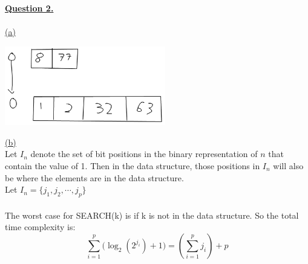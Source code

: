 \documentclass[12pt]{article}
\newcommand{\bigbracket}[1]{\big(#1\big)}
\newcommand{\code}[1]{{\ttfamily \fontseries{b}\selectfont #1}}
\begin{document}
\newpage
{{\LARGE \noindent \underline{\textbf{Question 2.}}}}
\\\\
\noindent \hyperlink{toc}{\hypertarget{2.1}{(a)}}\\
\begin{center}
	\includegraphics[width=7cm]{CSCB63_A3_2.png}
\end{center}
\noindent \hyperlink{toc}{\hypertarget{2.2}{(b)}}\\
% 
Let $I_n$ denote the set of bit positions in the binary representation of $n$ that contain the value of 1. Then in the data structure, those positions in $I_n$ will also be where the elements are in the data structure.\\
Let $I_n = \{j_1, j_2, \cdots, j_p\}$
\\\\
The worst case for \code{SEARCH(k)} is if \code{k} is not in the data structure. So the total time complexity is:
$$ \sum_{i=1}^{p} \bigbracket{\log_2(2^{j_i}) + 1} = \left(\sum_{i=1}^{p} {j_i}\right) + p$$
\end{document}
